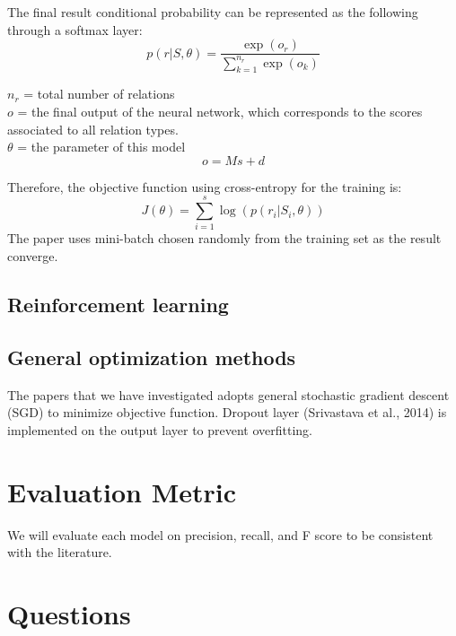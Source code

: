 \documentclass{article}
\begin{document}
	The final result conditional probability can be represented as the following through a softmax layer:
	\[p(r|S, \theta) = \frac{\exp(o_r)}{\displaystyle\sum_{k=1}^{n_r} \exp(o_k)}\]

	\(n_r\) = total number of relations \\
	\(o\) = the final output of the neural network, which corresponds to the scores associated to all relation types. \\
	\(\theta\) = the parameter of this model \\
	\[o = Ms + d\]	

	Therefore, the objective function using cross-entropy for the training is:
	\[J(\theta) = \displaystyle\sum_{i=1}^{s} \log(p(r_i|S_i, \theta)) \]
	The paper uses mini-batch chosen randomly from the training set as the result converge.
	
	
\subsection{Reinforcement learning}


\subsection{General optimization methods}
	The papers that we have investigated adopts general stochastic gradient descent (SGD) to minimize objective function.
	Dropout layer (Srivastava et al., 2014) is implemented on the output layer to prevent overfitting.

\section{Evaluation Metric}
	We will evaluate each model on precision, recall, and F score to be consistent with the literature.
 
 
\section{Questions}



\medskip




\small
\end{document}

